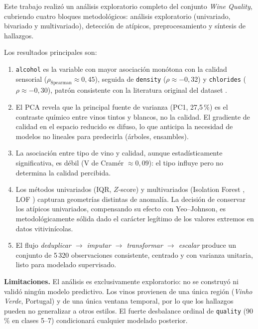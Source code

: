\documentclass[conference]{IEEEtran}
\begin{document}
Este trabajo realizó un análisis exploratorio completo del conjunto
\textit{Wine Quality}, cubriendo cuatro bloques metodológicos: análisis
exploratorio (univariado, bivariado y multivariado), detección de atípicos,
preprocesamiento y síntesis de hallazgos.

Los resultados principales son:

\begin{enumerate}
    \item \texttt{alcohol} es la variable con mayor asociación monótona con
    la calidad sensorial ($\rho_{\text{Spearman}} \approx 0{,}45$), seguida
    de \texttt{density} ($\rho \approx -0{,}32$) y \texttt{chlorides}
    ($\rho \approx -0{,}30$), patrón consistente con la literatura original
    del dataset \cite{cortez2009wine}.

    \item El PCA revela que la principal fuente de varianza (PC1, 27,5\,\%)
    es el contraste químico entre vinos tintos y blancos, no la calidad. El
    gradiente de calidad en el espacio reducido es difuso, lo que anticipa la
    necesidad de modelos no lineales para predecirla (árboles, ensambles).

    \item La asociación entre tipo de vino y calidad, aunque estadísticamente
    significativa, es débil (V de Cramér $\approx 0{,}09$): el tipo influye
    pero no determina la calidad percibida.

    \item Los métodos univariados (IQR, $Z$-score) y multivariados (Isolation
    Forest \cite{liu2008iforest}, LOF \cite{breunig2000lof}) capturan
    geometrías distintas de anomalía. La decisión de conservar los atípicos
    univariados, compensando su efecto con Yeo--Johnson, es metodológicamente
    sólida dado el carácter legítimo de los valores extremos en datos
    vitivinícolas.

    \item El flujo \textit{deduplicar $\rightarrow$ imputar $\rightarrow$
    transformar $\rightarrow$ escalar} produce un conjunto de 5\,320
    observaciones consistente, centrado y con varianza unitaria, listo para
    modelado supervisado.
\end{enumerate}

\textbf{Limitaciones.} El análisis es exclusivamente exploratorio: no se
construyó ni validó ningún modelo predictivo. Los vinos provienen de una única
región (\textit{Vinho Verde}, Portugal) y de una única ventana temporal, por
lo que los hallazgos pueden no generalizar a otros estilos. El fuerte desbalance
ordinal de \texttt{quality} (90\,\% en clases 5--7) condicionará cualquier
modelado posterior.
\end{document}
